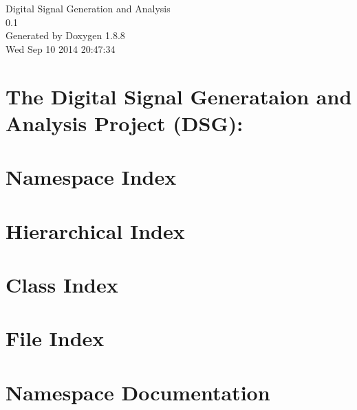 \documentclass[twoside]{book}
\newcommand{\+}{\discretionary{\mbox{\scriptsize$\hookleftarrow$}}{}{}}
\newcommand{\clearemptydoublepage}{%
  \newpage{\pagestyle{empty}\cleardoublepage}%
}
\begin{document}
\hypersetup{pageanchor=false,
             bookmarks=true,
             bookmarksnumbered=true,
             pdfencoding=unicode
            }
\begin{titlepage}
\vspace*{7cm}
\begin{center}%
{\Large Digital Signal Generation and Analysis \\[1ex]\large 0.\+1 }\\
\vspace*{1cm}
{\large Generated by Doxygen 1.8.8}\\
\vspace*{0.5cm}
{\small Wed Sep 10 2014 20:47:34}\\
\end{center}
\end{titlepage}
\clearemptydoublepage
\tableofcontents
\clearemptydoublepage
{}
\hypersetup{pageanchor=true}

\chapter{The Digital Signal Generataion and Analysis Project (D\+S\+G)\+:}
\label{index}\hypertarget{index}{}
\chapter{Namespace Index}

\chapter{Hierarchical Index}

\chapter{Class Index}

\chapter{File Index}

\chapter{Namespace Documentation}


\end{document}
